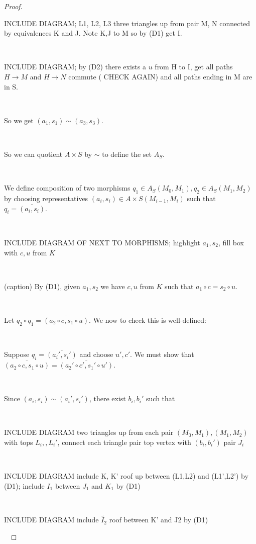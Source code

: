 \documentclass[12pt]{amsart}    %
\theoremstyle{definition}
\begin{document}
\begin{proof}
\

INCLUDE DIAGRAM; L1, L2, L3 three triangles up from pair M, N connected by equivalences K and J. Note K,J to M so by (D1) get I.

\

INCLUDE DIAGRAM; by (D2) there exists a $u$ from H to I, get all paths $H \rightarrow M$ and $H \rightarrow N$ commute ( CHECK AGAIN) and all paths ending in M are in S. 

\

So we get $(a_1, s_1) \sim (a_3,s_3)$.


\

So we can quotient $A\times S$ by $\sim$ to define the set $A_S$.

\

We define composition of two morphisms $q_1 \in A_S(M_0,M_1), q_2 \in A_S(M_1,M_2)$ by choosing representatives $(a_i,s_i)\in A\times S(M_{i-1},M_i)$ such that $q_i = \overline{(a_i,s_i)}$.

\

INCLUDE DIAGRAM OF NEXT TO MORPHISMS; highlight $a_1, s_2$, fill box with $c, u$ from $K$

\

(caption) By (D1), given $a_1, s_2$ we have $c,u$ from $K$ such that $a_1 \circ c = s_2 \circ u$.

\

Let $q_2 \circ q_1 = \overline{(a_2 \circ c, s_1 \circ u)}$.  We now to check this is well-defined:

\

Suppose $q_i = \overline{(a_i',s_i')}$ and choose $u', c'$.  We must show that $\overline{(a_2 \circ c, s_1 \circ u)} = \overline{(a_2' \circ c', s_1' \circ u')}$.  

\

Since $(a_i,s_i) \sim (a_i', s_i')$, there exist $b_i, b_i'$ such that 

\

INCLUDE DIAGRAM two triangles up from each pair $(M_0,M_1), (M_1,M_2)$ with tops $L_i,, L_i'$, connect each triangle pair top vertex with $(b_i, b_i')$ pair $J_i$ 

\

INCLUDE DIAGRAM include K, K' roof up between (L1,L2) and (L1',L2') by (D1); include $I_1$ between $J_1$ and $K_1$ by (D1)

\

INCLUDE DIAGRAM include $\tilde{I_2}$ roof between K' and J2 by (D1)

\


\end{proof}
\end{document}
